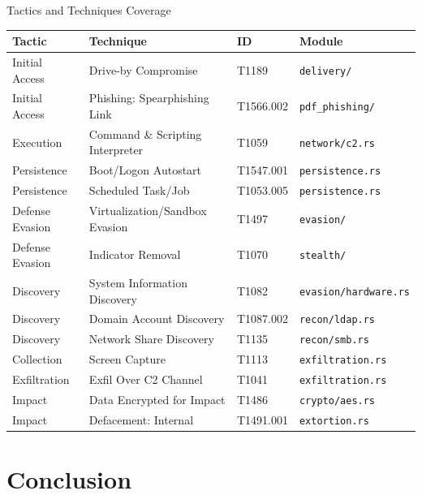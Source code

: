 \documentclass[aspectratio=169]{beamer}
\newcommand{\code}[1]{\texttt{\textcolor{primaryblue}{#1}}}
\begin{document}
\begin{frame}{Tactics and Techniques Coverage}
  \footnotesize
  \begin{tabular}{llll}
    \toprule
    \textbf{Tactic} & \textbf{Technique} & \textbf{ID} & \textbf{Module} \\
    \midrule
    Initial Access & Drive-by Compromise & T1189 & \code{delivery/} \\
    Initial Access & Phishing: Spearphishing Link & T1566.002 & \code{pdf\_phishing/} \\
    Execution & Command \& Scripting Interpreter & T1059 & \code{network/c2.rs} \\
    Persistence & Boot/Logon Autostart & T1547.001 & \code{persistence.rs} \\
    Persistence & Scheduled Task/Job & T1053.005 & \code{persistence.rs} \\
    Defense Evasion & Virtualization/Sandbox Evasion & T1497 & \code{evasion/} \\
    Defense Evasion & Indicator Removal & T1070 & \code{stealth/} \\
    Discovery & System Information Discovery & T1082 & \code{evasion/hardware.rs} \\
    Discovery & Domain Account Discovery & T1087.002 & \code{recon/ldap.rs} \\
    Discovery & Network Share Discovery & T1135 & \code{recon/smb.rs} \\
    Collection & Screen Capture & T1113 & \code{exfiltration.rs} \\
    Exfiltration & Exfil Over C2 Channel & T1041 & \code{exfiltration.rs} \\
    Impact & Data Encrypted for Impact & T1486 & \code{crypto/aes.rs} \\
    Impact & Defacement: Internal & T1491.001 & \code{extortion.rs} \\
    \bottomrule
  \end{tabular}
\end{frame}

\section{Conclusion}
\end{document}
